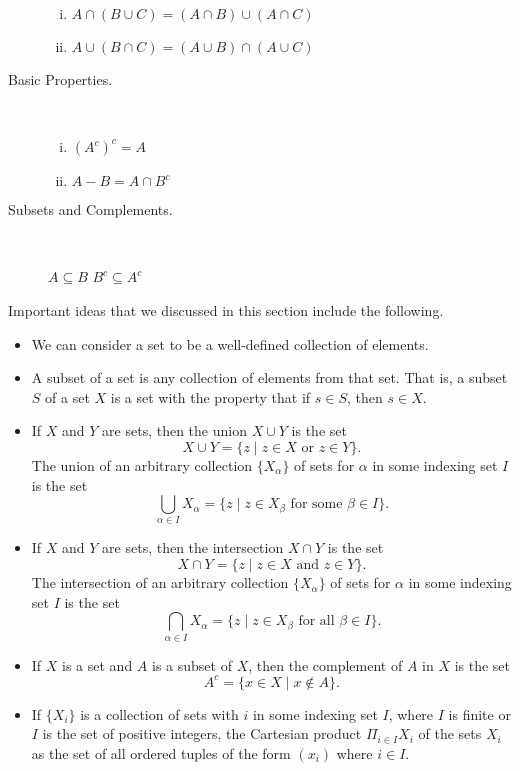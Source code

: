 \begin{theorem}
\begin{multicols}{2}
\begin{description}
	\begin{enumerate}[i.]
	\item $A \cap (B \cup C) = (A \cap B) \cup (A \cap C)$ 
	\item$A \cup (B \cap C) = (A \cup B) \cap (A \cup C)$ 
	\end{enumerate}
\item[Basic Properties.] ~
	\begin{enumerate}[i.]
	\item $\left(A^c\right)^c = A$ 
	\item $A - B = A \cap B^c$ 
	\end{enumerate}
\item[Subsets and Complements.] ~

$A \subseteq B$  $B^c \subseteq A^c$
\end{description}
\end{multicols}
\end{theorem}

Important ideas that we discussed in this section include the following.
\begin{itemize}
\item We can consider a set to be a well-defined collection of elements.
\item A subset of a set is any collection of elements from that set. That is, a subset $S$ of a set $X$ is a set with the property that if $s \in S$, then $s \in X$. 
\item If $X$ and $Y$ are sets, then the union $X \cup Y$ is the set 
\[X \cup Y = \{z \mid z \in X \text{ or } z \in Y\}.\]
The union of an arbitrary collection $\{X_{\alpha}\}$ of sets for $\alpha$ in some indexing set $I$ is the set 
\[\bigcup_{\alpha \in I} X_{\alpha} = \{z \mid z \in X_{\beta} \text{ for some } \beta \in I\}.\]
\item If $X$ and $Y$ are sets, then the intersection $X \cap Y$ is the set 
\[X \cap Y = \{z \mid z \in X \text{ and } z \in Y\}.\]
The intersection of an arbitrary collection $\{X_{\alpha}\}$ of sets for $\alpha$ in some indexing set $I$ is the set 
\[\bigcap_{\alpha \in I} X_{\alpha} = \{z \mid z \in X_{\beta} \text{ for all } \beta \in I\}.\]
\item If $X$ is a set and $A$ is a subset of $X$, then the complement of $A$ in $X$ is the set 
\[A^c = \{x \in X \mid x \notin A\}.\]
\item If $\{X_{i}\}$ is a collection of sets with $i$ in some indexing set $I$, where $I$ is finite or $I$ is the set of positive integers, the Cartesian product $\Pi_{i \in I} X_i$ of the sets $X_{i}$ as the set of all ordered tuples of the form $(x_i)$ where $i \in I$. 
\end{itemize}

